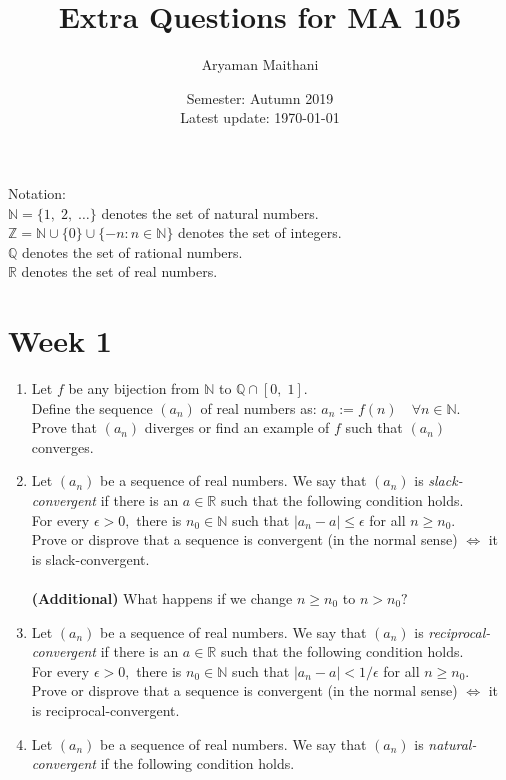 \documentclass{article}
\title{Extra Questions for MA 105}
\author{Aryaman Maithani}
\date{Semester: Autumn 2019\\ Latest update: \today}
\begin{document}
\maketitle
\hrulefill

Notation:\\
$\mathbb{N} = \{1,\; 2,\; \ldots\}$ denotes the set of natural numbers.\\
$\mathbb{Z} = \mathbb{N} \cup \{0\} \cup \{-n : n\in\mathbb{N}\}$ denotes the set of integers.\\
$\mathbb{Q}$ denotes the set of rational numbers.\\
$\mathbb{R}$ denotes the set of real numbers.
\section{Week 1}
\begin{enumerate}
	\item Let $f$ be any bijection from $\mathbb{N}$ to $\mathbb{Q} \cap [0,\; 1].$\\
	Define the sequence $(a_n)$ of real numbers as: $a_n := f(n) \quad \forall n \in \mathbb{N}.$\\
	Prove that $(a_n)$ diverges or find an example of $f$ such that $(a_n)$ converges.
	\item Let $(a_n)$ be a sequence of real numbers. We say that $(a_n)$ is \emph{slack-convergent} if there is an $a \in \mathbb{R}$ such that the following condition holds.\\
	For every $\epsilon > 0,$ there is $n_0 \in \mathbb{N}$ such that $|a_n - a| \le \epsilon$ for all $n \ge n_0.$\\
	Prove or disprove that a sequence is convergent (in the normal sense) $\iff$ it is slack-convergent.\\~\\
	\textbf{(Additional)} What happens if we change $n \ge n_0$ to $n > n_0?$
	\item Let $(a_n)$ be a sequence of real numbers. We say that $(a_n)$ is \emph{reciprocal-convergent} if there is an $a \in \mathbb{R}$ such that the following condition holds.\\
	For every $\epsilon > 0,$ there is $n_0 \in \mathbb{N}$ such that $|a_n - a| < 1/\epsilon$ for all $n \ge n_0.$\\
	Prove or disprove that a sequence is convergent (in the normal sense) $\iff$ it is reciprocal-convergent.
	\item Let $(a_n)$ be a sequence of real numbers. We say that $(a_n)$ is \emph{natural-convergent} if the following condition holds.\\

\end{enumerate}
\end{document}
